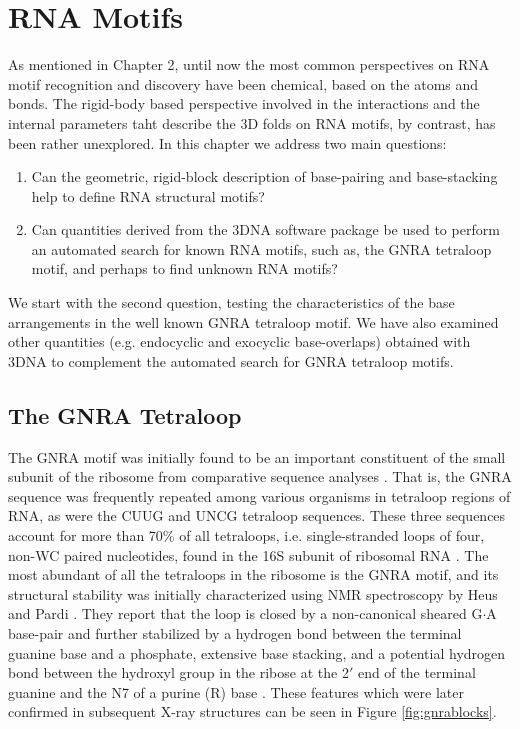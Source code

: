 \chapter{RNA Motifs}
\label{motifs} 

As mentioned  in Chapter 2,  until  now the most  common perspectives on
RNA motif recognition  and discovery have been chemical,  based on the
atoms  and bonds.  The  rigid-body based  perspective involved  in the
interactions and the internal parameters taht describe the 3D folds on
RNA motifs, by contrast, has  been rather unexplored.  In this chapter
we address two main questions:

\begin{enumerate}
\item{Can the  geometric, rigid-block description  of base-pairing and
  base-stacking help to define RNA structural motifs?}
\item{Can quantities derived from the 3DNA software package be used to
  perform an automated search for  known RNA motifs, such as, the GNRA
  tetraloop motif, and perhaps to find unknown RNA motifs?}
\end{enumerate}

We start with the second  question, testing the characteristics of the
base arrangements  in the  well known GNRA  tetraloop motif.   We have
also  examined  other   quantities  (e.g.   endocyclic  and  exocyclic
base-overlaps) obtained with 3DNA \cite{lu2003, lu2008b} to complement
the automated search for GNRA tetraloop motifs.

\section{The GNRA Tetraloop}
The GNRA motif  was initially found to be  an important constituent of
the small  subunit of the ribosome from  comparative sequence analyses
\cite{woese1990}. That  is, the GNRA sequence  was frequently repeated
among various organisms in tetraloop  regions of RNA, as were the CUUG
and UNCG  tetraloop sequences. These three sequences  account for more
than  70\% of  all tetraloops,  i.e.  single-stranded  loops  of four,
non-WC paired nucleotides,  found in the 16S subunit  of ribosomal RNA
\cite{woese1990, depaul2010}.  The most abundant of all the tetraloops
in the  ribosome is the GNRA  motif, and its  structural stability was
initially  characterized  using NMR  spectroscopy  by  Heus and  Pardi
\cite{heus1991}.   They   report  that  the   loop  is  closed   by  a
non-canonical sheared G$\cdot$A base-pair  and further stabilized by a
hydrogen  bond between  the  terminal guanine  base  and a  phosphate,
extensive  base stacking, and  a potential  hydrogen bond  between the
hydroxyl group in  the ribose at the 2$'$ end  of the terminal guanine
and the N7 of a  purine (R) base \cite{heus1991}. These features which
were later  confirmed in subsequent  X-ray structures \cite{pley1994b}
can be seen in Figure \ref{fig:gnrablocks}.

